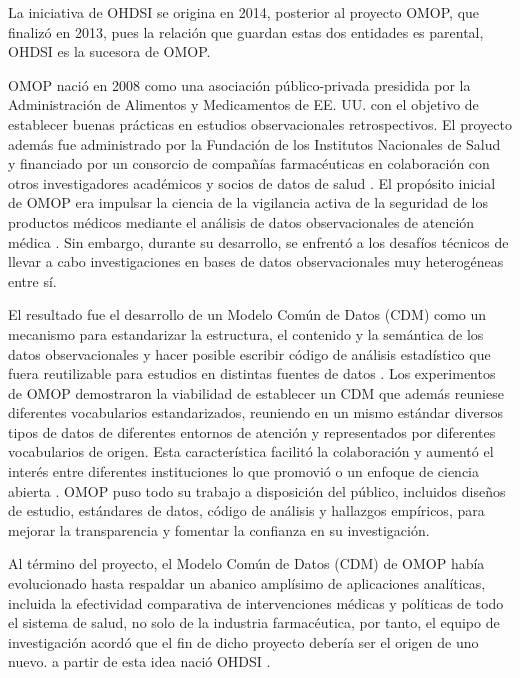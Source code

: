 La iniciativa de OHDSI se origina en 2014, posterior al proyecto OMOP, que finalizó en 2013, pues la relación que guardan estas dos entidades es parental, OHDSI es la sucesora de OMOP.

OMOP nació en 2008 como una asociación público-privada presidida por la Administración de Alimentos y Medicamentos de EE. UU. con el objetivo de establecer buenas prácticas en estudios observacionales retrospectivos. El proyecto además fue administrado por la Fundación de los Institutos Nacionales de Salud y financiado por un consorcio de compañías farmacéuticas en colaboración con otros investigadores académicos y socios de datos de salud \cite{stang2010advancing}. El propósito inicial de OMOP era impulsar la ciencia de la vigilancia activa de la seguridad de los productos médicos mediante el análisis de datos observacionales de atención médica \cite{stang2010advancing}. Sin embargo, durante su desarrollo, se enfrentó a los desafíos técnicos de llevar a cabo investigaciones en bases de datos observacionales muy heterogéneas entre sí.

El resultado fue el desarrollo de un Modelo Común de Datos (CDM) como un mecanismo para estandarizar la estructura, el contenido y la semántica de los datos observacionales y hacer posible escribir código de análisis estadístico que fuera reutilizable para estudios en distintas fuentes de datos \cite{overhage2012validation}. Los experimentos de OMOP demostraron la viabilidad de establecer un CDM que además reuniese diferentes vocabularios estandarizados, reuniendo en un mismo estándar diversos tipos de datos de diferentes entornos de atención y representados por diferentes vocabularios de origen. Esta característica facilitó la colaboración y aumentó el interés entre diferentes instituciones lo que promovió o un enfoque de ciencia abierta \cite{OHDSIbook}. OMOP puso todo su trabajo a disposición del público, incluidos diseños de estudio, estándares de datos, código de análisis y hallazgos empíricos, para mejorar la transparencia y fomentar la confianza en su investigación. 

Al término del proyecto, el Modelo Común de Datos (CDM) de OMOP había evolucionado hasta respaldar un abanico  amplísimo de aplicaciones analíticas, incluida la efectividad comparativa de intervenciones médicas y políticas de todo el sistema de salud, no solo de la industria farmacéutica, por tanto, el equipo de investigación acordó que el fin de dicho proyecto debería ser el origen de uno nuevo. a partir de esta idea nació OHDSI \cite{OHDSIbook}.

